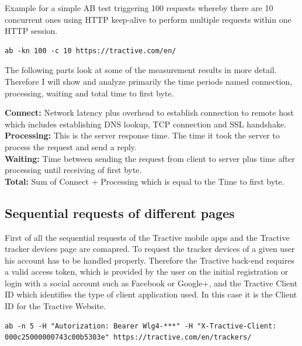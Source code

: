 Example for a simple AB test triggering 100 requests whereby there are 10 concurrent ones using HTTP keep-alive to perform multiple requests within one HTTP session.
\begin{lstlisting}[caption=AB load testing both sequential and concurrent]
ab -kn 100 -c 10 https://tractive.com/en/
\end{lstlisting}

The following parts look at some of the measurement results in more detail.
Therefore I will show and analyze primarily the time periods named connection, processing, waiting and total time to first byte.

\textbf{Connect:} Network latency plus overhead to establish connection to remote host which includes establishing DNS lookup, TCP connection and SSL handshake.\\
\textbf{Processing:} This is the server response time. The time it took the server to process the request and send a reply.\\
\textbf{Waiting:} Time between sending the request from client to server plus time after processing until receiving of first byte.\\
\textbf{Total:} Sum of Connect + Processing which is equal to the Time to first byte.\\

\subsection{Sequential requests of different pages}
First of all the sequential requests of the Tractive mobile apps and the Tractive tracker devices page are comapred. To request the tracker devices of a given user his account has to be handled properly. Therefore the Tractive back-end requires a valid access token, which is provided by the user on the initial registration or login with a social account such as Facebook or Google+, and the Tractive Client ID which identifies the type of client application used. In this case it is the Client ID for the Tractive Website.

\begin{lstlisting}[caption=ab load testing with authorization details in request header]
ab -n 5 -H "Autorization: Bearer Wlg4-***" -H "X-Tractive-Client: 000c25000000743c00b5303e" https://tractive.com/en/trackers/
\end{lstlisting}

